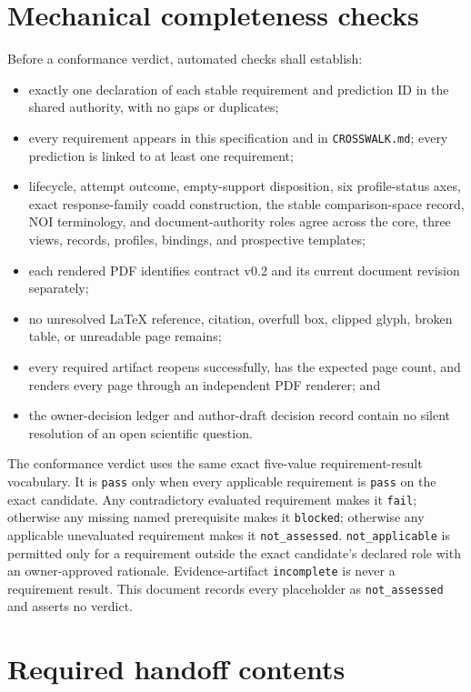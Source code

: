 \documentclass[10pt]{article}
\begin{document}
\clearpage
\section{Mechanical completeness checks}

Before a conformance verdict, automated checks shall establish:

\begin{itemize}
\item exactly one declaration of each stable requirement and prediction ID in
the shared authority, with no gaps or duplicates;
\item every requirement appears in this specification and in
\texttt{CROSSWALK.md}; every prediction is linked to at least one requirement;
\item lifecycle, attempt outcome, empty-support disposition, six profile-status
axes, exact response-family coadd construction, the stable comparison-space
record, NOI terminology, and document-authority roles agree across the core,
three views, records, profiles, bindings, and prospective templates;
\item each rendered PDF identifies contract v0.2 and its current document
revision separately;
\item no unresolved LaTeX reference, citation, overfull box, clipped glyph,
broken table, or unreadable page remains;
\item every required artifact reopens successfully, has the expected page
count, and renders every page through an independent PDF renderer; and
\item the owner-decision ledger and author-draft decision record contain no
silent resolution of an open scientific question.
\end{itemize}

The conformance verdict uses the same exact five-value requirement-result
vocabulary. It is \texttt{pass} only when every applicable requirement is
\texttt{pass} on the exact candidate. Any contradictory evaluated requirement
makes it \texttt{fail}; otherwise any missing named prerequisite makes it
\texttt{blocked}; otherwise any applicable unevaluated requirement makes it
\texttt{not\_assessed}. \texttt{not\_applicable} is permitted only for a
requirement outside the exact candidate's declared role with an owner-approved
rationale. Evidence-artifact \texttt{incomplete} is never a requirement result.
This document records every placeholder as \texttt{not\_assessed} and asserts
no verdict.

\section{Required handoff contents}
\end{document}
